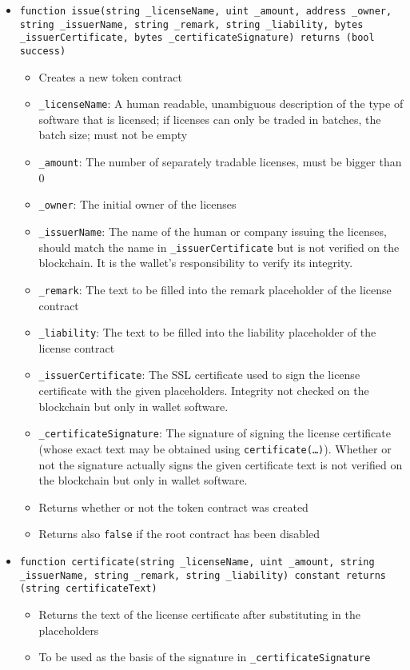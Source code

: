 \documentclass[a4paper]{article}
\begin{document}
\begin{itemize}
  \item \texttt{function issue(string \_licenseName, uint \_amount, address \_owner, string \_issuerName, string \_remark, string \_liability, bytes \_issuerCertificate, bytes \_certificateSignature) returns (bool success)}
  \begin{itemize}
    \item Creates a new token contract
    \item \texttt{\_licenseName}: A human readable, unambiguous description of the type of software that is licensed; if licenses can only be traded in batches, the batch size; must not be empty
    \item \texttt{\_amount}: The number of separately tradable licenses, must be bigger than 0
    \item \texttt{\_owner}: The initial owner of the licenses
    \item \texttt{\_issuerName}: The name of the human or company issuing the licenses, should match the name in \texttt{\_issuerCertificate} but is not verified on the blockchain. It is the wallet's responsibility to verify its integrity.
    \item \texttt{\_remark}: The text to be filled into the remark placeholder of the license contract
    \item \texttt{\_liability}: The text to be filled into the liability placeholder of the license contract
    \item \texttt{\_issuerCertificate}: The SSL certificate used to sign the license certificate with the given placeholders. Integrity not checked on the blockchain but only in wallet software.
    \item \texttt{\_certificateSignature}: The signature of signing the license certificate (whose exact text may be obtained using \texttt{certificate(…)}). Whether or not the signature actually signs the given certificate text is not verified on the blockchain but only in wallet software.
    \item Returns whether or not the token contract was created
    \item Returns also \texttt{false} if the root contract has been disabled
  \end{itemize}
  
  \item \texttt{function certificate(string \_licenseName, uint \_amount, string \_issuerName, string \_remark, string \_liability) constant returns (string certificateText)}
  \begin{itemize}
    \item Returns the text of the license certificate after substituting in the placeholders
    \item To be used as the basis of the signature in \texttt{\_certificateSignature}
  \end{itemize}
  

\end{itemize}
\end{document}
